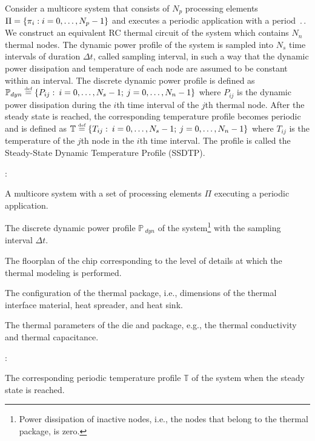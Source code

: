 Consider a multicore system that consists of $N_p$ processing elements $\Pi = \{ \pi_i: i = 0, \dots, N_p - 1 \}$ and executes a periodic application with a period $\period$. We construct an equivalent RC thermal circuit of the system which contains $N_n$ thermal nodes. The dynamic power profile of the system is sampled into $N_s$ time intervals of duration $\Delta t$, called sampling interval, in such a way that the dynamic power dissipation and temperature of each node are assumed to be constant within an interval. The discrete dynamic power profile is defined as $\mathbb{P}_{dyn} \eqdef \{ P_{ij}: \: i = \range{0}{N_s - 1}; \: j = \range{0}{N_n - 1} \}$ where $P_{ij}$ is the dynamic power dissipation during the $i$th time interval of the $j$th thermal node. After the steady state is reached, the corresponding temperature profile becomes periodic and is defined as $\mathbb{T} \eqdef \{ T_{ij}: \: i = \range{0 }{N_s - 1}; \: j = \range{0}{N_n - 1} \}$ where $T_{ij}$ is the temperature of the $j$th node in the $i$th time interval. The profile is called the Steady-State Dynamic Temperature Profile (SSDTP).

:
\begin{ilist}
  \item A multicore system with a set of processing elements $\Pi$ executing a periodic application.
  \item The discrete dynamic power profile $\mathbb{P}_{\:dyn}$ of the system\footnote{Power dissipation of inactive nodes, i.e., the nodes that belong to the thermal package, is zero.} with the sampling interval $\Delta t$.
  \item The floorplan of the chip corresponding to the level of details at which the thermal modeling is performed.
  \item The configuration of the thermal package, i.e., dimensions of the thermal interface material, heat spreader, and heat sink.
  \item The thermal parameters of the die and package, e.g., the thermal conductivity and thermal capacitance.
\end{ilist}

:
\begin{ilist}
  \item The corresponding periodic temperature profile $\mathbb{T}$ of the system when the steady state is reached.
\end{ilist}
